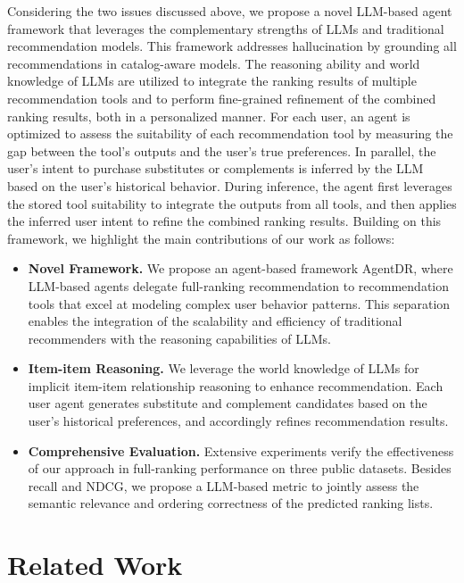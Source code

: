Considering the two issues discussed above, we propose a novel LLM-based agent framework that leverages the complementary strengths of LLMs and traditional recommendation models. This framework addresses hallucination by grounding all recommendations in catalog-aware models. The reasoning ability and world knowledge of LLMs are utilized to integrate the ranking results of multiple recommendation tools and to perform fine-grained refinement of the combined ranking results, both in a personalized manner. For each user, an agent is optimized to assess the suitability of each recommendation tool by measuring the gap between the tool’s outputs and the user’s true preferences. In parallel, the user’s intent to purchase substitutes or complements is inferred by the LLM based on the user’s historical behavior. During inference, the agent first leverages the stored tool suitability to integrate the outputs from all tools, and then applies the inferred user intent to refine the combined ranking results.
Building on this framework, we highlight the main contributions of our work as follows:
\begin{itemize}[left=0pt]
    \item \textbf{Novel Framework.} We propose an agent-based framework AgentDR, where LLM-based agents delegate full-ranking recommendation to recommendation tools that excel at modeling complex user behavior patterns. This separation enables the integration of the scalability and efficiency of traditional recommenders with the reasoning capabilities of LLMs.
    \item \textbf{Item-item Reasoning.} We leverage the world knowledge of LLMs for implicit item-item relationship reasoning to enhance recommendation. Each user agent generates substitute and complement candidates based on the user's historical preferences, and accordingly refines recommendation results.
    \item \textbf{Comprehensive Evaluation.} Extensive experiments verify the effectiveness of our approach in full-ranking performance on three public datasets. Besides recall and NDCG, we propose a LLM-based metric to jointly assess the semantic relevance and ordering correctness of the predicted ranking lists.
\end{itemize}

\section{Related Work}

